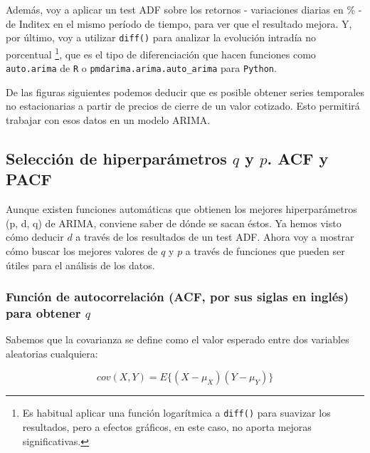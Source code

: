 
Además, voy a aplicar un test ADF sobre los retornos - variaciones diarias en \% - de Inditex en el mismo período de tiempo, para ver que el resultado mejora. Y, por último, voy a utilizar \texttt{diff()} para analizar la evolución intradía no porcentual \footnote{Es habitual aplicar una función logarítmica a \texttt{diff()} para suavizar los resultados, pero a efectos gráficos, en este caso, no aporta mejoras significativas.}, que es el tipo de diferenciación que hacen funciones como \texttt{auto.arima} de \texttt{R} o \texttt{pmdarima.arima.auto\_arima} para \texttt{Python}.

De las figuras siguientes podemos deducir que es posible obtener series temporales no estacionarias a partir de precios de cierre de un valor cotizado. Esto permitirá trabajar con esos datos en un modelo ARIMA.




\subsection{Selección de hiperparámetros $q$ y $p$. ACF y PACF}

Aunque existen funciones automáticas que obtienen los mejores hiperparámetros (p, d, q) de ARIMA, conviene saber de dónde se sacan éstos. Ya hemos visto cómo deducir $d$ a través de los resultados de un test ADF. Ahora voy a mostrar cómo buscar los mejores valores de $q$ y $p$ a través de funciones que pueden ser útiles para el análisis de los datos.

\subsubsection{Función de autocorrelación (ACF, por sus siglas en inglés) para obtener $q$}

Sabemos que la covarianza se define como el valor esperado entre dos variables aleatorias cualquiera:

\begin{equation}
	cov(X, Y) = E\{(X - \mu_{X})(Y - \mu_{Y})\}
\end{equation}

